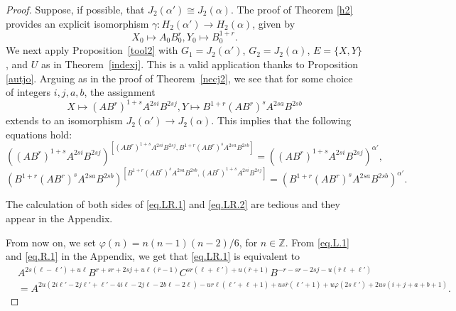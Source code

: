 \documentclass{amsart}
\theoremstyle{definition}
\theoremstyle{remark}
\newcommand \Z{{\mathbb Z}}
\begin{document}
\begin{proof} Suppose, if possible, that $J_2(\alpha')\cong J_2(\alpha)$. The proof of Theorem \ref{h2} provides an explicit isomorphism
$\gamma:H_2(\alpha')\to H_2(\alpha)$, given by
$$
X_0\mapsto A_0B_0^r, Y_0\mapsto B_0^{1+r}.
$$
We next apply Proposition~\ref{tool2} with $G_1=J_2(\alpha')$, $G_2=J_2(\alpha)$, $E=\{X,Y\}$, and $U$ as in Theorem~\ref{indexj}.
This is a valid application thanks to Proposition \ref{autjo}. Arguing as in the proof of Theorem~\ref{necj2}, we see that
for some choice of integers $i,j,a,b$, the assignment
$$
X\mapsto (AB^r)^{1+s}A^{2si}B^{2sj}, Y\mapsto B^{1+r} (AB^r)^s A^{2sa}B^{2sb}
$$
extends to an isomorphism $J_2(\alpha')\to J_2(\alpha)$. This implies that the following equations hold:
\begin{equation}\label{eq.LR.1}
    ((AB^r)^{1+s}A^{2si}B^{2sj})^{[(AB^r)^{1+s}A^{2si}B^{2sj},B^{1+r} (AB^r)^s A^{2sa}B^{2sb}]}
    = ((AB^r)^{1+s}A^{2si}B^{2sj})^{\alpha'},
\end{equation}
\begin{equation}\label{eq.LR.2}
    (B^{1+r} (AB^r)^s A^{2sa}B^{2sb})^{[B^{1+r} (AB^r)^s A^{2sa}B^{2sb},(AB^r)^{1+s}A^{2si}B^{2sj}]}
    = (B^{1+r} (AB^r)^s A^{2sa}B^{2sb})^{\alpha'}.
\end{equation}


The calculation of both sides of \eqref{eq.LR.1} and \eqref{eq.LR.2} are tedious and they appear in the Appendix.

From now on, we set $\varphi(n)=n(n-1)(n-2)/6$, for $n\in\Z$. From \eqref{eq.L.1} and \eqref{eq.R.1} in the Appendix, we get that \eqref{eq.LR.1} is equivalent to
\begin{align*}
    &A^{2s(\ell - \ell') + u\ell} B^{r + sr + 2sj + u\ell(\overline{r} - 1)} C^{sr(\ell + \ell') + u(\overline{r} + 1)} B^{-r - sr - 2sj - u(\overline{r}\ell + \ell')}\\
    &= A^{2u(2i\ell' - 2j\ell' + \ell' - 4i\ell - 2j\ell - 2b\ell - 2\ell) - ur\ell(\ell' + \ell + 1) + us\overline{r}(\ell' + 1) + u\varphi(2s\ell') + 2us(i + j + a + b + 1)}.
\end{align*}


\end{proof}
\end{document}
